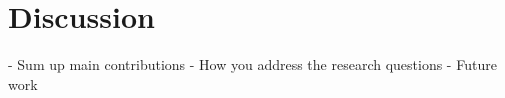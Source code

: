 
\chapter{Discussion} \label{discussion}

- Sum up main contributions
- How you address the research questions
- Future work